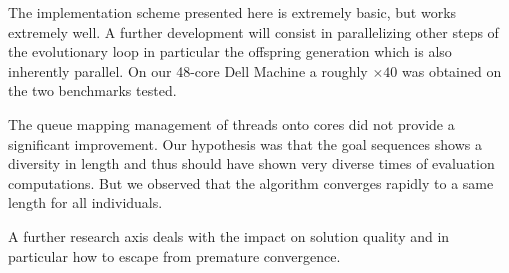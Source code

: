 \documentclass{sig-alternate}
\begin{document}
The implementation scheme presented here is extremely basic, but works extremely well.
A further development will consist in parallelizing other steps of the evolutionary loop in particular the offspring generation which is also inherently parallel.
On our 48-core Dell Machine a roughly $\times40$ was obtained on the two benchmarks tested.

The queue mapping management of threads onto cores did not provide a significant improvement. Our hypothesis was that the goal sequences shows a diversity in length and thus should have shown very diverse times of evaluation computations. But we observed that the algorithm converges rapidly to a same length for all individuals.


A further research axis deals with the impact on solution quality and in particular how to escape from premature convergence.








%

%
%
\end{document}
